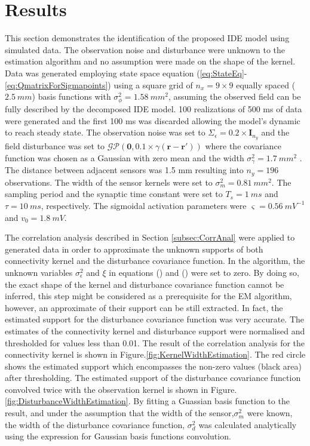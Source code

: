 \documentclass[]{article}
\begin{document}
\section{Results}
This section demonstrates the identification of the proposed IDE model using simulated data. The observation noise and disturbance were unknown to the estimation algorithm and no assumption were made on the shape of the kernel.  Data was generated employing state space equation (\ref{eq:StateEq}-\ref{eq:QmatrixForSigmapoints}) using a square grid of $n_x= 9 \times 9$ equally spaced ($2.5~mm$) basis functions with $\sigma_{\phi}^2=1.58~mm^2$, assuming the observed field can be fully described by the decomposed IDE model. 100 realizations of 500 ms of data were generated and the first 100 ms was discarded allowing the model's dynamic to reach steady state. The observation noise was set to $\Sigma_{\epsilon}=0.2\times \mathbf I_{n_y}$ and the field disturbance was set to $\mathcal{GP}(\mathbf 0,0.1 \times\gamma(\mathbf{r}-\mathbf{r}'))$ where the covariance function was chosen as a Gaussian with zero mean and the width $\sigma_{\gamma}^2=1.7~mm^2$ . The distance between adjacent sensors was 1.5 mm resulting into $n_y = 196$ observations. The width of the sensor kernels were set to $\sigma_m^2=0.81~mm^2$. The sampling period and the synaptic time constant were set to $T_s = 1~ms$  and $\tau = 10~ms$, respectively. The sigmoidal activation parameters were $\varsigma=0.56~mV^{-1}$ and $v_0=1.8~mV$.

The correlation analysis described in Section \ref{subsec:CorrAnal} were applied to generated data in order to approximate the unknown supports of both connectivity kernel and the disturbance covariance function. In the algorithm, the unknown variables $\sigma_{\epsilon}^2$ and $\xi$ in equations () and () were set to zero. By doing so, the exact shape of the kernel and disturbance covariance function cannot be inferred, this step might be considered as a prerequisite for the EM algorithm, however, an approximate of their support can be still extracted. In fact, the estimated support for the disturbance covariance function was very accurate. The estimates of the connectivity kernel and disturbance support were normalised and thresholded for values less than 0.01. The result of the correlation analysis for the connectivity kernel is shown in Figure.\ref{fig:KernelWidthEstimation}. The red circle shows the estimated support which encompasses the non-zero values (black area) after thresholding. The estimated support of the disturbance covariance function convolved twice with the observation kernel is shown in Figure.\ref{fig:DisturbanceWidthEstimation}. By fitting a Guassian basis function to the result, and under the assumption that the width of the sensor,$\sigma_m^2$ were known, the width of the disturbance covariance function, $\sigma_d^2$ was calculated analytically using the expression for Gaussian basis functions convolution.
\end{document}
